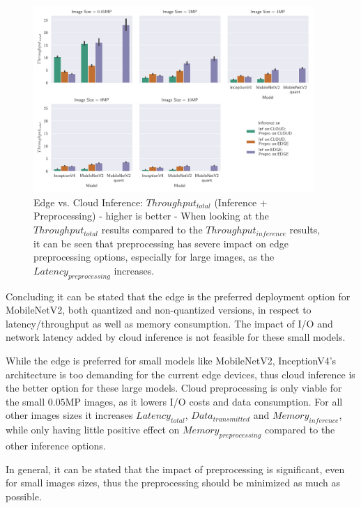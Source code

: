 \begin{figure}[!htb]
\centering
\includegraphics[width=0.95\textwidth]{./Bilder/single_plots/edge_vs_cloud_plots/Edge_vs_Cloud_Inference_Throughput_with_Preprocessing.pdf}
\caption[Edge vs. Cloud Inference:  $Throughput_{total}$ - higher is better]{Edge vs. Cloud Inference:  $Throughput_{total}$ (Inference + Preprocessing) - higher is better - 
When looking at the $Throughput_{total}$ results compared to the $Throughput_{inference}$ results, it can be seen that preprocessing has severe impact on edge preprocessing options, especially for large images, as the $Latency_{preprocessing}$ increases.}
\label{fig:EdgeVsCloudTotalThroughput}
\end{figure}




Concluding it can be stated that the edge is the preferred deployment option for MobileNetV2, both quantized and non-quantized versions, in respect to latency/throughput as well as memory consumption.
The impact of I/O and network latency added by cloud inference is not feasible for these small models.

While the edge is preferred for small models like MobileNetV2, InceptionV4's architecture is too demanding for the current edge devices, thus cloud inference is the better option for these large models.
Cloud preprocessing is only viable for the small $0.05$MP images, as it lowers I/O costs and data consumption. For all other images sizes it increases $Latency_{total}$, $Data_{transmitted}$ and $Memory_{inference}$, while only having little positive effect on $Memory_{preprocessing}$ compared to the other inference options.

In general, it can be stated that the impact of preprocessing is significant, even for small images sizes, thus the preprocessing should be minimized as much as possible.

